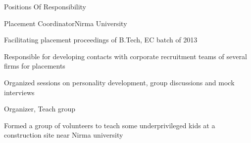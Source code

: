 \documentclass{resume} %
\begin{document}
		\begin{rSection}{Positions Of Responsibility}	%
		
		\begin{rSubsection}{Placement Coordinator}{Nirma University}{}{}
			\item Facilitating placement proceedings of B.Tech, EC batch of 2013
			\item Responsible for developing contacts with corporate recruitment teams of several firms for placements 
			\item Organized sessions on personality development, group discussions and mock interviews
		\end{rSubsection}
		
		
		\begin{rSubsection}{Organizer, Teach group}{}{}{}
		\item Formed  a group of volunteers to teach some underprivileged kids at a construction site near Nirma university 
		\end{rSubsection}
		
	\end{rSection}
	

	
\end{document}
